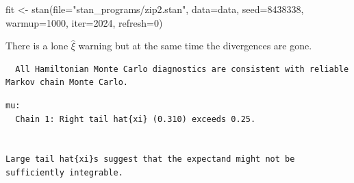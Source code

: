 \documentclass[
  letterpaper,
  DIV=11,
  numbers=noendperiod]{scrartcl}
\newenvironment{Shaded}{\begin{snugshade}}{\end{snugshade}}
\newcommand{\AttributeTok}[1]{\textcolor[rgb]{0.40,0.45,0.13}{#1}}
\newcommand{\DecValTok}[1]{\textcolor[rgb]{0.68,0.00,0.00}{#1}}
\newcommand{\FunctionTok}[1]{\textcolor[rgb]{0.28,0.35,0.67}{#1}}
\newcommand{\NormalTok}[1]{\textcolor[rgb]{0.00,0.23,0.31}{#1}}
\newcommand{\OtherTok}[1]{\textcolor[rgb]{0.00,0.23,0.31}{#1}}
\newcommand{\SpecialCharTok}[1]{\textcolor[rgb]{0.37,0.37,0.37}{#1}}
\newcommand{\StringTok}[1]{\textcolor[rgb]{0.13,0.47,0.30}{#1}}
\begin{document}
\begin{Shaded}
\begin{Highlighting}[]
\NormalTok{fit }\OtherTok{\textless{}{-}} \FunctionTok{stan}\NormalTok{(}\AttributeTok{file=}\StringTok{"stan\_programs/zip2.stan"}\NormalTok{,}
            \AttributeTok{data=}\NormalTok{data, }\AttributeTok{seed=}\DecValTok{8438338}\NormalTok{,}
            \AttributeTok{warmup=}\DecValTok{1000}\NormalTok{, }\AttributeTok{iter=}\DecValTok{2024}\NormalTok{, }\AttributeTok{refresh=}\DecValTok{0}\NormalTok{)}
\end{Highlighting}
\end{Shaded}

There is a lone \(\hat{\xi}\) warning but at the same time the
divergences are gone.

\begin{Shaded}
\end{Shaded}

\begin{verbatim}
  All Hamiltonian Monte Carlo diagnostics are consistent with reliable
Markov chain Monte Carlo.
\end{verbatim}

\begin{Shaded}
\end{Shaded}

\begin{verbatim}
mu:
  Chain 1: Right tail hat{xi} (0.310) exceeds 0.25.


Large tail hat{xi}s suggest that the expectand might not be
sufficiently integrable.
\end{verbatim}
\end{document}
